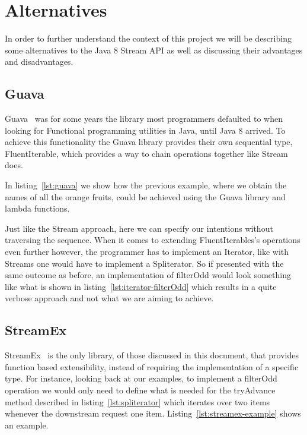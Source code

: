 \chapter{Alternatives}

In order to further understand the context of this project we will be describing some alternatives to the Java 8 Stream API as well as discussing their advantages and disadvantages.

\section{Guava}

Guava~\citep{guava} was for some years the library most programmers defaulted to when looking for Functional programming utilities in Java, until Java 8 arrived. To achieve this functionality the Guava library provides their own sequential type, FluentIterable, which provides a way to chain operations together like Stream does.

\newpage
In listing~\ref{lst:guava} we show how the previous example, where we obtain the names of all the orange fruits, could be achieved using the Guava library and lambda functions.



Just like the Stream approach, here we can specify our intentions without traversing the sequence. When it comes to extending FluentIterables's operations even further however, the programmer has to implement an Iterator, like with Streams one would have to implement a Spliterator. So if presented with the same outcome as before, an implementation of filterOdd would look something like what is shown in listing~\ref{lst:iterator-filterOdd} which results in a quite verbose approach and not what we are aiming to achieve.



\section{StreamEx}

StreamEx~\citep{streamex} is the only library, of those discussed in this document, that provides function based extensibility, instead of requiring the implementation of a specific type. For instance, looking back at our examples, to implement a filterOdd operation we would only need to define what is needed for the tryAdvance method described in listing~\ref{lst:spliterator} which iterates over two items whenever the downstream request one item. Listing~\ref{lst:streamex-example} shows an example.

